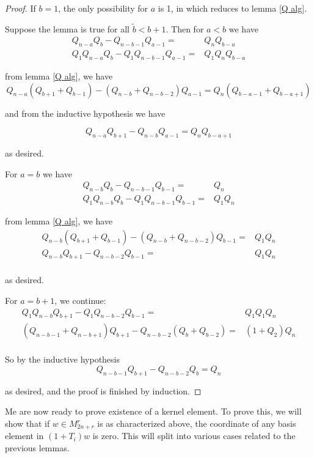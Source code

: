 \documentclass{amsart}
\begin{document}
\begin{proof}
	If $b=1$, the only possibility for $a$ is 1, in which reduces to lemma \ref{Q alg}.
	
	Suppose the lemma is true for all $\tilde{b}<b+1$. Then for $a< b$ we have 
	\begin{align*}	
	Q_{n-a}Q_b -Q_{n-b-1}Q_{a-1}=&Q_{n}Q_{b-a}\\
	Q_1Q_{n-a}Q_b-Q_1Q_{n-b-1}Q_{a-1}=&Q_1Q_{n}Q_{b-a}
	\end{align*}
	
	from lemma \ref{Q alg}, we have	
	$$Q_{n-a}(Q_{b+1}+Q_{b-1})-(Q_{n-b}+Q_{n-b-2})Q_{a-1}=Q_{n}(Q_{b-a-1}+Q_{b-a+1})$$
	
	and from the inductive hypothesis we have
	
	$$Q_{n-a}Q_{b+1}-Q_{n-b}Q_{a-1}=Q_{n}Q_{b-a+1}$$
	
	as desired.
	
	For $a=b$ we have 
	\begin{align*}
	Q_{n-b}Q_b -Q_{n-b-1}Q_{b-1}=&Q_{n}\\
	Q_1Q_{n-b}Q_b-Q_1Q_{n-b-1}Q_{b-1}=&Q_1Q_{n}
	\end{align*}
	
	from lemma \ref{Q alg}, we have
	\begin{align*}
	Q_{n-b}(Q_{b+1}+Q_{b-1})-(Q_{n-b}+Q_{n-b-2})Q_{b-1}=&Q_1Q_{n}\\
	Q_{n-b}Q_{b+1}-Q_{n-b-2}Q_{b-1}=&Q_1Q_{n}\\
	\end{align*}
	
	as desired.
	
	For $a=b+1$, we continue:
	\begin{align*}
	Q_1Q_{n-b}Q_{b+1}-Q_1Q_{n-b-2}Q_{b-1}=&Q_1Q_1Q_{n}\\
	(Q_{n-b-1}+Q_{n-b+1})Q_{b+1}-Q_{n-b-2}(Q_{b}+Q_{b-2})=&(1+Q_2)Q_{n}\\
	\end{align*}
	
	So by the inductive hypothesis
	$$Q_{n-b-1}Q_{b+1}-Q_{n-b-2}Q_{b}=Q_{n}$$
	
	as desired, and the proof is finished by induction.
	
\end{proof}

\vspace{5mm}
Me are now ready to prove existence of a kernel element. To prove this, we will show that if $w\in M_{2n+r}^r$ is as characterized above, the coordinate of any basis element in $(1+T_i)w$ is zero. This will split into various cases related to the previous lemmas.
\end{document}
